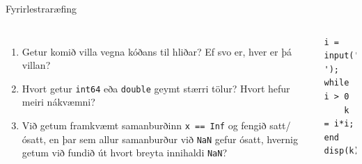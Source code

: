 \documentclass{beamer}
\begin{document}
\begin{frame}[fragile]{Fyrirlestraræfing}
\begin{columns}
\begin{enumerate}
 \item Getur komið villa vegna kóðans til hliðar? Ef svo er, hver er þá villan?
 \item Hvort getur \texttt{int64} eða \texttt{double} geymt stærri tölur? Hvort hefur meiri nákvæmni?
 \item Við getum framkvæmt samanburðinn \texttt{x == Inf} og fengið satt/ósatt, en þar sem allur samanburður við \texttt{NaN} gefur ósatt, hvernig getum við fundið út hvort breyta innihaldi \texttt{NaN}?
\end{enumerate}
\begin{verbatim}
i = input('i: ');
while i > 0
    k = i*i;
end
disp(k)
\end{verbatim}

\end{columns}
\end{frame}
\end{document}
